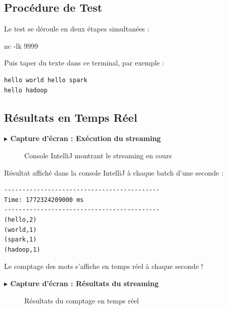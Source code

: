 \documentclass[12pt,a4paper]{report}
\newcommand{\cmd}[1]{\texttt{\colorbox{grisCode}{\strut #1}}}
\newcommand{\etape}[1]{\vspace{6pt}\textbf{\color{bleuESP}$\blacktriangleright$ #1}\vspace{4pt}}
\begin{document}
\subsection{Procédure de Test}

Le test se déroule en deux étapes simultanées :


\begin{cmdbox}
nc -lk 9999
\end{cmdbox}

Puis taper du texte dans ce terminal, par exemple :
\begin{verbatim}
hello world hello spark
hello hadoop
\end{verbatim}

\subsection{Résultats en Temps Réel}

\etape{Capture d'écran : Exécution du streaming}
\begin{figure}[H]
  \centering
  \caption{Console IntelliJ montrant le streaming en cours}
\end{figure}

\begin{successbox}
Résultat affiché dans la console IntelliJ à chaque batch d'une seconde :
\begin{verbatim}
-------------------------------------------
Time: 1772324209000 ms
-------------------------------------------
(hello,2)
(world,1)
(spark,1)
(hadoop,1)
\end{verbatim}
Le comptage des mots s'affiche en temps réel à chaque seconde !
\end{successbox}

\etape{Capture d'écran : Résultats du streaming}
\begin{figure}[H]
  \centering
  \caption{Résultats du comptage en temps réel}
\end{figure}
\end{document}
